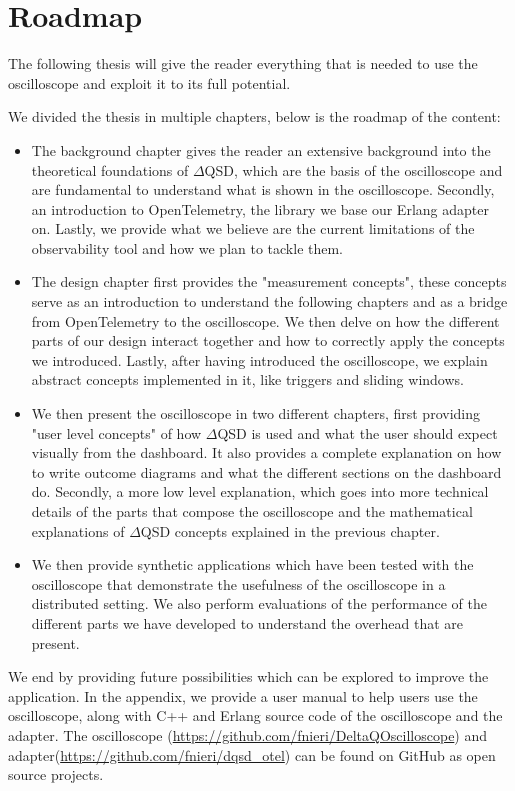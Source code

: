 \section{Roadmap}
    The following thesis will give the reader everything that is needed to use the oscilloscope and exploit it to its full potential.

    We divided the thesis in multiple chapters, below is the roadmap of the content:
    \begin{itemize}
        \item The background chapter gives the reader an extensive background into the theoretical foundations of $\Delta$QSD, which are the basis of the oscilloscope and are fundamental to understand what is shown in the oscilloscope. Secondly, an introduction to OpenTelemetry, the library we base our Erlang adapter on. Lastly, we provide what we believe are the current limitations of the observability tool and how we plan to tackle them.
        \item The design chapter first provides the "measurement concepts", these concepts serve as an introduction to understand the following chapters and as a bridge from OpenTelemetry to the oscilloscope.  We then delve on how the different parts of our design interact together and how to correctly apply the concepts we introduced. Lastly, after having introduced the oscilloscope, we explain abstract concepts implemented in it, like triggers and sliding windows.
        \item We then present the oscilloscope in two different chapters, first providing "user level concepts" of how $\Delta$QSD is used and what the user should expect visually from the dashboard. It also provides a complete explanation on how to write outcome diagrams and what the different sections on the dashboard do.
            Secondly, a more low level explanation, which goes into more technical details of the parts that compose the oscilloscope and the mathematical explanations of $\Delta$QSD concepts explained in the previous chapter.
        \item We then provide synthetic applications which have been tested with the oscilloscope that demonstrate the usefulness of the oscilloscope in a distributed setting. We also perform evaluations of the performance of the different parts we have developed to understand the overhead that are present.
    \end{itemize}

    We end by providing future possibilities which can be explored to improve the application. In the appendix, we provide a user manual to help users use the oscilloscope, along with C++ and Erlang source code of the oscilloscope and the adapter.
   \sloppy The oscilloscope (\url{https://github.com/fnieri/DeltaQOscilloscope}) and adapter(\url{https://github.com/fnieri/dqsd_otel}) can be found on GitHub as open source projects.
